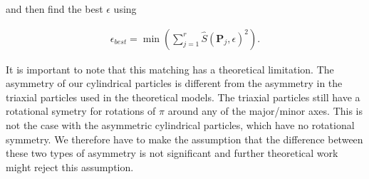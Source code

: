 \noindent and  then find the best $\epsilon$ using

\begin{eqnarray}
\epsilon_{best} = \min(\sum\limits_{j=1}^{r} \hat{S}(\mathbf{P}_j, \epsilon)^2).
\end{eqnarray}


It is important to note that this matching has a theoretical limitation. The asymmetry of our cylindrical particles is different from the asymmetry in the triaxial particles used in the theoretical models. The triaxial particles still have a rotational symetry for rotations of $\pi$ around any of the major/minor axes. This is not the case with the asymmetric cylindrical particles, which have no rotational symmetry. We therefore have to make the assumption that the difference between these two types of asymmetry is not significant and further theoretical work might reject this assumption.

